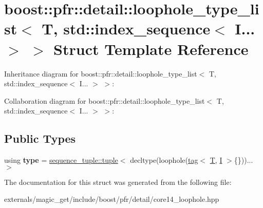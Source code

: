 \hypertarget{structboost_1_1pfr_1_1detail_1_1loophole__type__list_3_01_t_00_01std_1_1index__sequence_3_01_i_8_8_8_01_4_01_4}{}\section{boost\+:\+:pfr\+:\+:detail\+:\+:loophole\+\_\+type\+\_\+list$<$ T, std\+:\+:index\+\_\+sequence$<$ I... $>$ $>$ Struct Template Reference}
\label{structboost_1_1pfr_1_1detail_1_1loophole__type__list_3_01_t_00_01std_1_1index__sequence_3_01_i_8_8_8_01_4_01_4}


Inheritance diagram for boost\+:\+:pfr\+:\+:detail\+:\+:loophole\+\_\+type\+\_\+list$<$ T, std\+:\+:index\+\_\+sequence$<$ I... $>$ $>$\+:


Collaboration diagram for boost\+:\+:pfr\+:\+:detail\+:\+:loophole\+\_\+type\+\_\+list$<$ T, std\+:\+:index\+\_\+sequence$<$ I... $>$ $>$\+:
\subsection*{Public Types}
\begin{DoxyCompactItemize}
\item 
\mbox{\label{structboost_1_1pfr_1_1detail_1_1loophole__type__list_3_01_t_00_01std_1_1index__sequence_3_01_i_8_8_8_01_4_01_4_a3f8f223549c11bd37f60829728407858}} 
using {\bfseries type} = \mbox{\hyperlink{structboost_1_1pfr_1_1detail_1_1sequence__tuple_1_1tuple}{sequence\+\_\+tuple\+::tuple}}$<$ decltype(loophole(\mbox{\hyperlink{structboost_1_1pfr_1_1detail_1_1tag}{tag}}$<$ \mbox{\hyperlink{struct_t}{T}}, \mbox{\hyperlink{classinput__iterator}{I}} $>$\{\}))... $>$
\end{DoxyCompactItemize}


The documentation for this struct was generated from the following file\+:\begin{DoxyCompactItemize}
\item 
externals/magic\+\_\+get/include/boost/pfr/detail/core14\+\_\+loophole.\+hpp\end{DoxyCompactItemize}
